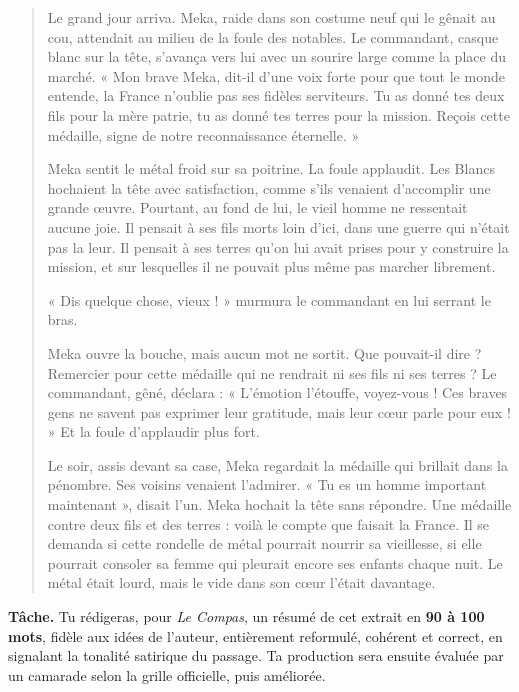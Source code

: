 \documentclass[11pt]{article}
\newcommand{\cle}[1]{{\popxbold\color{popdark}#1}}
\newcounter{popsec}
\newcounter{popsub}
\newcommand{\courssub}[1]{%
  \stepcounter{popsub}%
  \par\vspace{9pt}\noindent{\popxbold\fontsize{11.5}{13}\selectfont\color{popink}{\color{poporange}\thepopsec.\thepopsub}\hspace{6pt}#1}\par\nopagebreak\vspace{4pt}
}
\begin{document}
\begin{quote}
Le grand jour arriva. Meka, raide dans son costume neuf qui le gênait au cou, attendait au milieu de la foule des notables. Le commandant, casque blanc sur la tête, s'avança vers lui avec un sourire large comme la place du marché. « Mon brave Meka, dit-il d'une voix forte pour que tout le monde entende, la France n'oublie pas ses fidèles serviteurs. Tu as donné tes deux fils pour la mère patrie, tu as donné tes terres pour la mission. Reçois cette médaille, signe de notre reconnaissance éternelle. »

Meka sentit le métal froid sur sa poitrine. La foule applaudit. Les Blancs hochaient la tête avec satisfaction, comme s'ils venaient d'accomplir une grande œuvre. Pourtant, au fond de lui, le vieil homme ne ressentait aucune joie. Il pensait à ses fils morts loin d'ici, dans une guerre qui n'était pas la leur. Il pensait à ses terres qu'on lui avait prises pour y construire la mission, et sur lesquelles il ne pouvait plus même pas marcher librement.

« Dis quelque chose, vieux ! » murmura le commandant en lui serrant le bras.

Meka ouvre la bouche, mais aucun mot ne sortit. Que pouvait-il dire ? Remercier pour cette médaille qui ne rendrait ni ses fils ni ses terres ? Le commandant, gêné, déclara : « L'émotion l'étouffe, voyez-vous ! Ces braves gens ne savent pas exprimer leur gratitude, mais leur cœur parle pour eux ! » Et la foule d'applaudir plus fort.

Le soir, assis devant sa case, Meka regardait la médaille qui brillait dans la pénombre. Ses voisins venaient l'admirer. « Tu es un homme important maintenant », disait l'un. Meka hochait la tête sans répondre. Une médaille contre deux fils et des terres : voilà le compte que faisait la France. Il se demanda si cette rondelle de métal pourrait nourrir sa vieillesse, si elle pourrait consoler sa femme qui pleurait encore ses enfants chaque nuit. Le métal était lourd, mais le vide dans son cœur l'était davantage.
\end{quote}

\textbf{Tâche.} Tu rédigeras, pour \emph{Le Compas}, un résumé de cet extrait en \textbf{90 à 100 mots}, fidèle aux idées de l'auteur, entièrement reformulé, cohérent et correct, en signalant la \cle{tonalité satirique} du passage. Ta production sera ensuite évaluée par un camarade selon la grille officielle, puis améliorée.

\courssub{Consignes}
\end{document}
